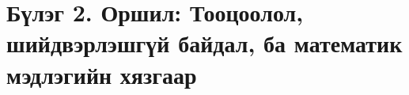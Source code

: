 \chapter{Бүлэг 2. Оршил: Тооцоолол, шийдвэрлэшгүй байдал, ба математик мэдлэгийн хязгаар}
\label{chap:regular}

